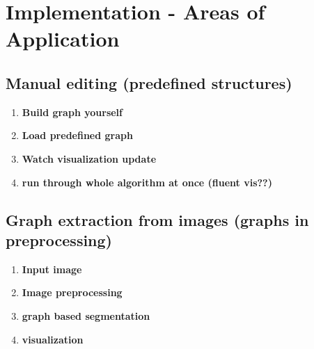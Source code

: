 \chapter{Implementation - Areas of Application}
\label{ch:impl_aoa}


\section{Manual editing (predefined structures)}
\label{sect:manual_editing}

	\begin{enumerate}
		\item \textbf{Build graph yourself}
		\item \textbf{Load predefined graph}
		\item \textbf{Watch visualization update}
		\item \textbf{run through whole algorithm at once (fluent vis??)}
	\end{enumerate}


\section{Graph extraction from images (graphs in preprocessing)}
\label{sect:graph_ext}

	\begin{enumerate}
		\item \textbf{Input image}
		\item \textbf{Image preprocessing}
		\item \textbf{graph based segmentation}
		\item \textbf{visualization}
	\end{enumerate}
	
